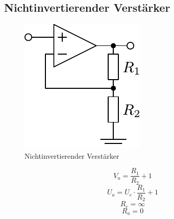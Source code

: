 



\subsection{Nichtinvertierender Verstärker}
\begin{figure}[h!]
	\centering
	\includegraphics[scale=\schscale]{../fig/op_ninv.pdf}
	\caption{Nichtinvertierender Verstärker}
	\label{sch:op-ninv}
\end{figure}
\[ V_u = \frac{R_1}{R_2} + 1 \]
\[ U_a = U_e \cdot \frac{R_1}{R_2} + 1 \]
\[ R_e = \infty \]
\[ R_a = 0 \]